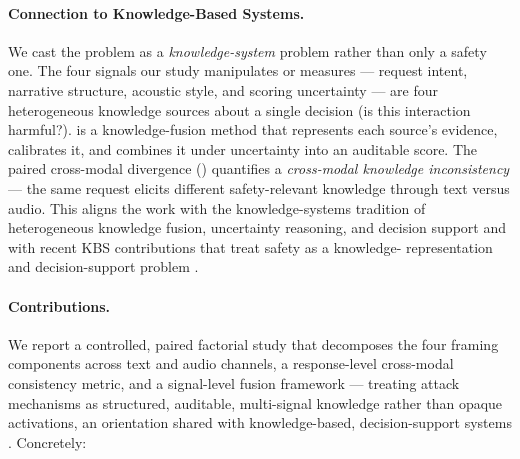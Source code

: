 \paragraph{Connection to Knowledge-Based Systems.}
We cast the problem as a \emph{knowledge-system} problem rather than only a
safety one. The four signals our study manipulates or measures --- request
intent, narrative structure, acoustic style, and scoring uncertainty --- are
four heterogeneous knowledge sources about a single decision (is this
interaction harmful?). \MSRF{} is a knowledge-fusion method that represents
each source's evidence, calibrates it, and combines it under uncertainty into
an auditable score. The paired cross-modal divergence (\PCSD) quantifies a
\emph{cross-modal knowledge inconsistency} --- the same request elicits
different safety-relevant knowledge through text versus audio. This aligns the
work with the knowledge-systems tradition of heterogeneous knowledge fusion,
uncertainty reasoning, and decision support
\citep{guo2024survey,shao2024duallevel,xu2025promethee,zhao2025ensemble,shafer1976}
and with recent KBS contributions that treat safety as a knowledge-
representation and decision-support problem \citep{srd,realignment}.

\paragraph{Contributions.}
We report a controlled, paired factorial study that decomposes the four framing
components across text and audio channels, a response-level cross-modal
consistency metric, and a signal-level fusion framework --- treating attack
mechanisms as structured, auditable, multi-signal knowledge rather than opaque
activations, an orientation shared with knowledge-based, decision-support
systems \citep{srd,realignment}. Concretely:

